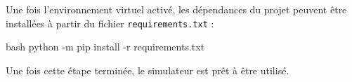 \vspace{10pt}

\noindent Une fois l'environnement virtuel activé, les dépendances du projet peuvent être installées à partir du fichier \texttt{requirements.txt} :

\begin{codebox}{bash}
    python -m pip install -r requirements.txt
\end{codebox}
\vspace{10pt}

\noindent Une fois cette étape terminée, le simulateur est prêt à être utilisé.
